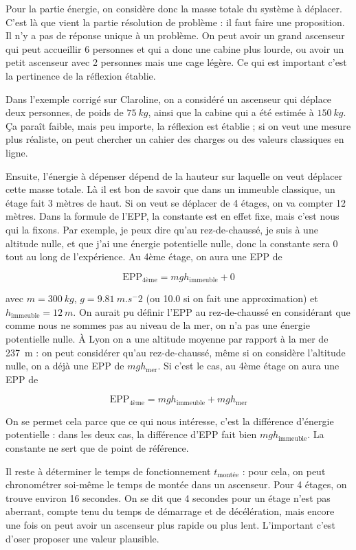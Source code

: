 \documentclass[10pt,a5paper,notitlepage]{book}
\begin{document}
Pour la partie énergie, on considère donc la masse totale du système à déplacer.
C'est là que vient la partie résolution de problème : il faut faire une
proposition. Il n'y a pas de réponse unique à un problème. On peut avoir un
grand ascenseur qui peut accueillir 6 personnes et qui a donc une cabine plus
lourde, ou avoir un petit ascenseur avec 2 personnes mais une cage légère. Ce
qui est important c'est la pertinence de la réflexion établie.

Dans l'exemple corrigé sur Claroline, on a considéré un ascenseur qui déplace
deux personnes, de poids de $\SI{75}{kg}$, ainsi que la cabine qui a été estimée
à $\SI{150}{kg}$. Ça paraît faible, mais peu importe, la réflexion est établie ;
si on veut une mesure plus réaliste, on peut chercher un cahier des charges ou
des valeurs classiques en ligne.

Ensuite, l'énergie à dépenser dépend de la hauteur sur laquelle on veut déplacer
cette masse totale. Là il est bon de savoir que dans un immeuble classique, un
étage fait 3 mètres de haut. Si on veut se déplacer de 4 étages, on va compter
12 mètres. Dans la formule de l'EPP, la constante est en effet fixe, mais c'est
nous qui la fixons. Par exemple, je peux dire qu'au rez-de-chaussé, je suis à
une altitude nulle, et que j'ai une énergie potentielle nulle, donc la constante
sera 0 tout au long de l'expérience. Au 4ème étage, on aura une EPP de

\[\mathrm{EPP}_\mathrm{4ème} = mgh_\mathrm{immeuble} + 0\]

avec $m= \SI{300}{kg}$, $g= \SI{9.81}{m.s^-2}$ (ou 10.0 si on fait une
approximation) et $h_\mathrm{immeuble}= \SI{12}{m}$. On aurait pu définir l'EPP
au rez-de-chaussé en considérant que comme nous ne sommes pas au niveau de la
mer, on n'a pas une énergie potentielle nulle. À Lyon on a une altitude moyenne
par rapport à la mer de \SI{237}{m} : on peut considérer qu'au rez-de-chaussé,
même si on considère l'altitude nulle, on a déjà une EPP de $mgh_\mathrm{mer}$.
Si c'est le cas, au 4ème étage on aura une EPP de

\[\mathrm{EPP}_\mathrm{4ème} = mgh_\mathrm{immeuble} + mgh_\mathrm{mer}\]

On se permet cela parce que ce qui nous intéresse, c'est la différence d'énergie
potentielle : dans les deux cas, la différence d'EPP fait bien
$mgh_\mathrm{immeuble}$. La constante ne sert que de point de référence.

Il reste à déterminer le temps de fonctionnement $t_\mathrm{montée}$ : pour
cela, on peut chronométrer soi-même le temps de montée dans un ascenseur. Pour 4
étages, on trouve environ 16 secondes. On se dit que 4 secondes pour un étage
n'est pas aberrant, compte tenu du temps de démarrage et de décélération, mais
encore une fois on peut avoir un ascenseur plus rapide ou plus lent. L'important
c'est d'oser proposer une valeur plausible.
\end{document}
